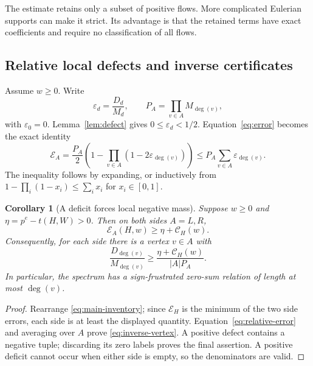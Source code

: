 \documentclass[11pt]{article}
\numberwithin{equation}{section}
\newtheorem{corollary}[theorem]{Corollary}
\theoremstyle{definition}
\theoremstyle{remark}
\newcommand{\Err}{\mathcal E}
\newcommand{\eps}{\varepsilon}
\begin{document}
The estimate retains only a subset of positive flows. More complicated
Eulerian supports can make it strict. Its advantage is that the retained
terms have exact coefficients and require no classification of all flows.

\subsection{Relative local defects and inverse certificates}

Assume $w\geq0$. Write
\begin{equation}
 \eps_d=\frac{D_d}{M_d},\qquad
 P_A=\prod_{v\in A}M_{\deg(v)},
 \label{eq:relative-defect}
\end{equation}
with $\eps_0=0$. Lemma~\ref{lem:defect} gives
$0\leq\eps_d<1/2$. Equation~\eqref{eq:error} becomes the exact identity
\begin{equation}
 \Err_A=\frac{P_A}{2}
   \left(1-\prod_{v\in A}(1-2\eps_{\deg(v)})\right)
 \leq P_A\sum_{v\in A}\eps_{\deg(v)}.
 \label{eq:relative-error}
\end{equation}
The inequality follows by expanding, or inductively from
$1-\prod_i(1-x_i)\leq\sum_i x_i$ for $x_i\in[0,1]$.

\begin{corollary}[A deficit forces local negative mass]
\label{cor:inverse}
Suppose $w\geq0$ and
$\eta=p^e-t(H,W)>0$. Then on \emph{both} sides $A=L,R$,
\begin{equation}
 \Err_A(H,w)\geq\eta+\mathcal C_H(w).
 \label{eq:inverse-error}
\end{equation}
Consequently, for each side there is a vertex $v\in A$ with
\begin{equation}
 \frac{D_{\deg(v)}}{M_{\deg(v)}}
 \geq\frac{\eta+\mathcal C_H(w)}{|A|P_A}.
 \label{eq:inverse-vertex}
\end{equation}
In particular, the spectrum has a sign-frustrated zero-sum relation of
length at most $\deg(v)$.
\end{corollary}
\begin{proof}
Rearrange \eqref{eq:main-inventory}; since $\Err_H$ is the minimum of
the two side errors, each side is at least the displayed quantity.
Equation~\eqref{eq:relative-error} and averaging over $A$ prove
\eqref{eq:inverse-vertex}. A positive defect contains a negative tuple;
discarding its zero labels proves the final assertion. A positive deficit
cannot occur when either side is empty, so the denominators are valid.
\end{proof}
\end{document}
